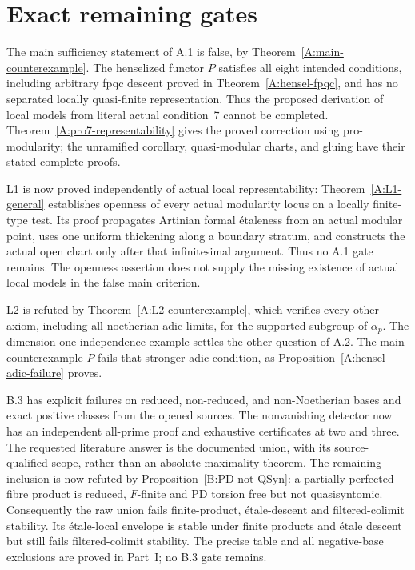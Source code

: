 \section{Exact remaining gates}
The main sufficiency statement of A.1 is false, by
Theorem~\ref{A:main-counterexample}. The henselized functor $P$
satisfies all eight intended conditions, including arbitrary fpqc
descent proved in Theorem~\ref{A:hensel-fpqc}, and has no separated
locally quasi-finite representation. Thus the proposed derivation
of local models from literal actual condition~7 cannot be completed.
Theorem~\ref{A:pro7-representability} gives the proved correction
using pro-modularity; the unramified corollary, quasi-modular charts,
and gluing have their stated complete proofs.

L1 is now proved independently of actual local representability:
Theorem~\ref{A:L1-general} establishes openness of every actual
modularity locus on a locally finite-type test. Its proof propagates
Artinian formal \'etaleness from an actual modular point, uses one
uniform thickening along a boundary stratum, and constructs the
actual open chart only after that infinitesimal argument.
Thus no A.1 gate remains. The openness assertion does not supply
the missing existence of actual local models in the false main
criterion.

L2 is refuted by Theorem~\ref{A:L2-counterexample}, which verifies
every other axiom, including all noetherian adic limits, for the
supported subgroup of $\alpha_p$. The dimension-one independence
example settles the other question of A.2. The main counterexample
$P$ fails that stronger adic condition, as
Proposition~\ref{A:hensel-adic-failure} proves.

B.3 has explicit failures on reduced, non-reduced, and non-Noetherian bases
and exact positive classes from the opened sources. The nonvanishing detector now has an independent all-prime proof and
exhaustive certificates at two and three. The requested literature
answer is the documented union, with its source-qualified scope, rather
than an absolute maximality theorem. The remaining inclusion is now
refuted by Proposition~\ref{B:PD-not-QSyn}: a partially perfected fibre
product is reduced, $F$-finite and PD torsion free but not quasisyntomic.
Consequently the raw union fails finite-product, \'etale-descent and
filtered-colimit stability. Its \'etale-local envelope is stable under
finite products and \'etale descent but still fails filtered-colimit
stability. The precise table and all negative-base exclusions are
proved in Part~I; no B.3 gate remains.

